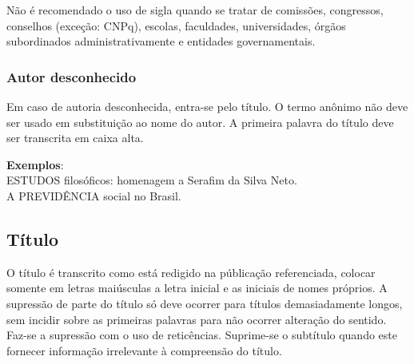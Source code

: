 Não é recomendado o uso de sigla quando se tratar de comissões, congressos, conselhos (exceção: CNPq), escolas, faculdades, universidades, órgãos subordinados administrativamente e entidades governamentais.


\subsubsection{Autor desconhecido}

Em caso de autoria desconhecida, entra-se pelo título. O termo anônimo não deve ser usado em substituição ao nome do autor. A primeira palavra do título deve ser transcrita em caixa alta.

\begin{exemplomanual}  
\textbf{Exemplos}:\\
ESTUDOS filosóficos: homenagem a Serafim da Silva Neto.\\
A PREVIDÊNCIA social no Brasil.
\end{exemplomanual}  


\subsection{Título}

O título é transcrito como está redigido na públicação referenciada, colocar somente em letras maiúsculas a letra inicial e as iniciais de nomes próprios. A supressão de parte do título só deve ocorrer para títulos demasiadamente longos, sem incidir sobre as primeiras palavras para não ocorrer alteração do sentido. Faz-se a supressão com o uso de reticências. Suprime-se o subtítulo quando este fornecer informação irrelevante à compreensão do título.

